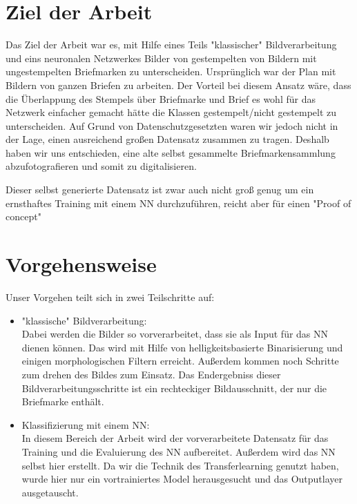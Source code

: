 \documentclass[12pt,toc=bib,toc=listof]{scrreprt}
\begin{document}
\section{Ziel der Arbeit} %
\label{sec:ziel_der_arbeit}
Das Ziel der Arbeit war es, mit Hilfe eines Teils "klassischer" Bildverarbeitung und eins neuronalen Netzwerkes Bilder von gestempelten von Bildern mit ungestempelten Briefmarken zu unterscheiden.
Ursprünglich war der Plan mit Bildern von ganzen Briefen zu arbeiten. Der Vorteil bei diesem Ansatz wäre, dass die Überlappung des Stempels über Briefmarke und Brief es wohl für das Netzwerk einfacher gemacht hätte die Klassen gestempelt/nicht gestempelt zu unterscheiden. Auf Grund von Datenschutzgesetzten waren wir jedoch nicht in der Lage, einen ausreichend großen Datensatz zusammen zu tragen. Deshalb haben wir uns entschieden, eine alte selbst gesammelte Briefmarkensammlung abzufotografieren und somit zu digitalisieren.


Dieser selbst generierte Datensatz ist zwar auch nicht groß genug um ein ernsthaftes Training mit einem NN durchzuführen, reicht aber für einen "Proof of concept"


\section{Vorgehensweise} %
\label{sec:vorgehensweise}

Unser Vorgehen teilt sich in zwei Teilschritte auf:
\begin{itemize}
\item "klassische" Bildverarbeitung:\\ 
Dabei werden die Bilder so vorverarbeitet, dass sie als Input für das NN dienen können. Das wird mit Hilfe von helligkeitsbasierte Binarisierung und einigen morphologischen Filtern erreicht. Außerdem kommen noch Schritte zum drehen des Bildes zum Einsatz. Das Endergebniss dieser Bildverarbeitungsschritte ist ein rechteckiger Bildausschnitt, der nur die Briefmarke enthält. 

\item Klassifizierung mit einem NN:\\
In diesem Bereich der Arbeit wird der vorverarbeitete Datensatz für das Training und die Evaluierung des NN aufbereitet. Außerdem wird das NN selbst hier erstellt. Da wir die Technik des Transferlearning genutzt haben, wurde hier nur ein vortrainiertes Model herausgesucht und das Outputlayer ausgetauscht.

\end{itemize}
\end{document}
